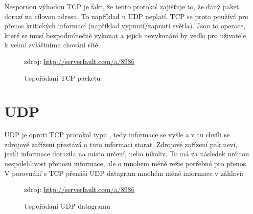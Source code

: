 Nespornou výhodou TCP je fakt, že tento protokol zajišťuje to, že daný paket dorazí na cílovou adresu. To například u UDP neplatí. TCP se proto používá pro přenos kritických informací (například vypnutí/zapnutí světla). Jsou to operace, které se musí bezpodmínečně vykonat a jejich nevykonání by vedlo pro uživatele k velmi zvláštnímu chování sítě.

\begin{figure}[H]
    \centering
	\caption{Uspořádání TCP packetu}
	\small zdroj: \url{http://serverfault.com/a/8986}
	\label{fig:tcp-packet}
\end{figure}


\section{UDP}
UDP  je oproti TCP protokol typu , tedy informace se vyšle a v tu chvíli se zdrojové zařízení přestává o tuto informaci starat. Zdrojové zařízení pak neví, jestli informace dorazila na místo určení, nebo nikoliv. To má za následek určitou nespolehlivost přenosu informace, ale o mnohem méně režie potřebné pro přenos. V porovnání s TCP přenáší UDP datagram mnohém méně informace v záhlaví:

\begin{figure}[H]
    \centering
	\caption{Uspořádání UDP datagramu}
	\small zdroj: \url{http://serverfault.com/a/8986}
	\label{fig:udp-datagram}
\end{figure}

